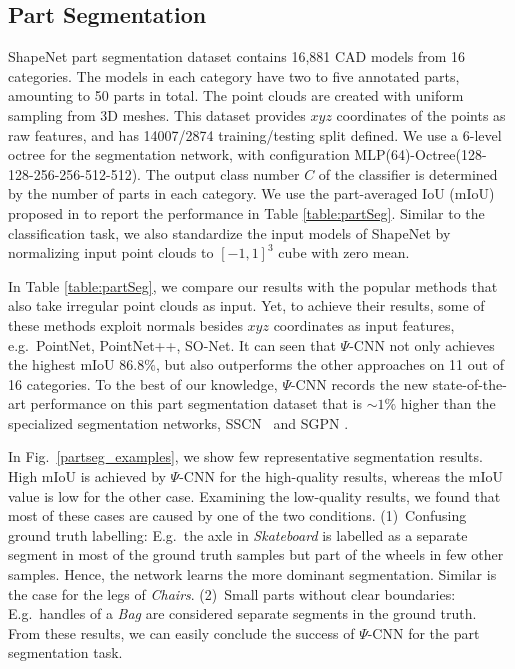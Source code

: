 \documentclass[10pt,twocolumn,letterpaper]{article}
\begin{document}
{\subsection{Part Segmentation}
ShapeNet part segmentation dataset \cite{yi2016scalable} contains 16,881  CAD models from 16 categories. The models in each category have two to five annotated parts, amounting to 50 parts in total. The point clouds are created with uniform sampling from 3D meshes.
This dataset provides  $xyz$ coordinates of the points as raw features, and has 14007/2874 training/testing split defined. 
We  use a 6-level octree for the segmentation network, with configuration MLP(64)-Octree(128-128-256-256-512-512). The output class number $C$ of the classifier is determined by the number of parts in each category.
We use the part-averaged IoU (mIoU)  proposed in \cite{qi2017pointnet} to report the performance in Table \ref{table:partSeg}. Similar to the classification task, we also standardize the input models of ShapeNet by normalizing input point
clouds to  $[-1,1]^3$ cube with zero mean.


In Table \ref{table:partSeg}, we compare our results with the popular methods that also take irregular point clouds as  input. Yet, to achieve their results, some of these methods exploit  normals besides $xyz$ coordinates as input features, e.g.~PointNet, PointNet++, SO-Net. 
It can seen that $\Psi$-CNN not only achieves the highest mIoU $86.8\%$, but also outperforms the other approaches on 11 out of 16 categories.
To the best of our knowledge, $\Psi$-CNN records the new state-of-the-art performance on this part segmentation dataset that is $\sim1\%$ higher than 
the specialized segmentation networks, SSCN~\cite{graham20183d} and SGPN \cite{wang2018sgpn}.



In Fig.~\ref{partseg_examples}, we show few representative segmentation results. High mIoU is achieved by $\Psi$-CNN for the high-quality results, whereas the mIoU value is low for the other case.  Examining the low-quality results, we found that most of these cases are caused by one of the two conditions. (1)~Confusing ground truth labelling: E.g.~the axle in \textit{Skateboard} is labelled as a separate  segment in most of the ground truth samples but part of the wheels in few other samples. Hence, the network learns the more dominant segmentation. Similar is the case for the legs of \textit{Chairs}. (2)~Small parts without clear boundaries: E.g.~handles of a \textit{Bag} are considered separate segments in the ground truth.  From these results, we can easily conclude the success of $\Psi$-CNN for the part segmentation task.




}
\end{document}
